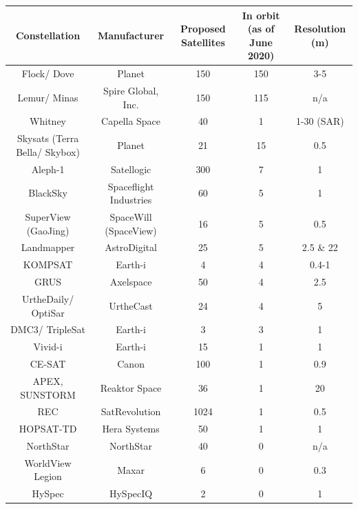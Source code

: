 \bigskip
\begin{center}
\vspace{3mm}
\begin{adjustbox}{width=0.9\textwidth}
\begin{tabular}{||c| c |c |c |c||}
\hline
\textbf{Constellation} & \textbf{Manufacturer} & \textbf{Proposed Satellites} & \textbf{In orbit} (as of June 2020) & \textbf{Resolution (m)}\\
\hline \hline
Flock/ Dove & Planet & 150 & 150 & 3-5\\%
Lemur/ Minas & Spire Global, Inc. & 150 & 115 & n/a\\
Whitney & Capella Space & 40 & 1 & 1-30 (SAR)\\
Skysats (Terra Bella/ Skybox) & Planet & 21 & 15 & 0.5\\
Aleph-1 & Satellogic & 300 & 7 & 1\\ %
BlackSky & Spaceflight Industries & 60 & 5 & 1\\%
SuperView (GaoJing) & SpaceWill (SpaceView) & 16 & 5 & 0.5\\%
Landmapper & AstroDigital & 25 & 5 & 2.5 \& 22\\
KOMPSAT & Earth-i & 4 & 4 & 0.4-1\\
GRUS & Axelspace & 50 & 4 & 2.5\\
UrtheDaily/ OptiSar & UrtheCast & 24 & 4 & 5\\
DMC3/ TripleSat & Earth-i & 3 & 3 & 1\\
Vivid-i & Earth-i & 15 & 1 & 1\\
CE-SAT & Canon & 100 & 1 & 0.9\\%
APEX, SUNSTORM & Reaktor Space & 36 & 1 & 20\\%
REC & SatRevolution & 1024 & 1 & 0.5\\
HOPSAT-TD & Hera Systems & 50 & 1 & 1\\
NorthStar & NorthStar & 40 & 0 & n/a\\%
WorldView Legion & Maxar & 6 & 0 & 0.3\\%
HySpec & HySpecIQ & 2 & 0 & 1\\ %




\end{tabular}
\end{adjustbox}
\end{center}
